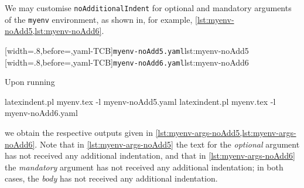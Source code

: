  \begin{example}
 We may customise \texttt{noAdditionalIndent} for optional and mandatory arguments of the
 \texttt{myenv} environment, as shown in, for example,
 \cref{lst:myenv-noAdd5,lst:myenv-noAdd6}.

 \begin{cmhtcbraster}
  [width=.8\linewidth,before=\centering,yaml-TCB]{\texttt{myenv-noAdd5.yaml}}{lst:myenv-noAdd5}
  [width=.8\linewidth,before=\centering,yaml-TCB]{\texttt{myenv-noAdd6.yaml}}{lst:myenv-noAdd6}
 \end{cmhtcbraster}

 Upon running 

 \begin{commandshell}
latexindent.pl myenv.tex -l myenv-noAdd5.yaml  
latexindent.pl myenv.tex -l myenv-noAdd6.yaml  
\end{commandshell}

 we obtain the respective outputs given in
 \cref{lst:myenv-args-noAdd5,lst:myenv-args-noAdd6}. Note that in
 \cref{lst:myenv-args-noAdd5} the text for the \emph{optional} argument has not received
 any additional indentation, and that in \cref{lst:myenv-args-noAdd6} the \emph{mandatory}
 argument has not received any additional indentation; in both cases, the \emph{body} has
 not received any additional indentation.

 \begin{cmhtcbraster}
 \end{cmhtcbraster}
 \end{example}

